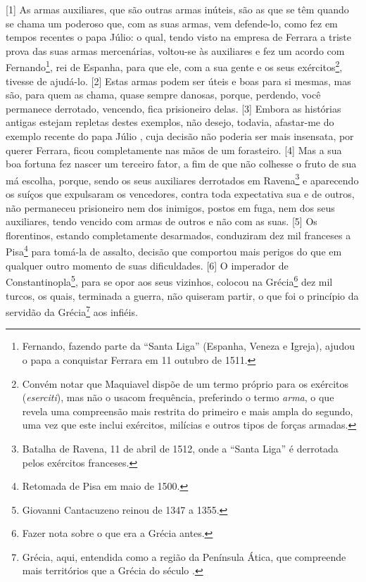 {[}1{]} As armas auxiliares, que são outras armas inúteis, são as que se
têm quando se chama um poderoso que, com as suas armas, vem defende-lo,
como fez em tempos recentes o papa Júlio: o qual, tendo visto na empresa
de Ferrara a triste prova das suas armas mercenárias, voltou-se às
auxiliares e fez um acordo com Fernando\footnote{Fernando, fazendo parte
  da ``Santa Liga'' (Espanha, Veneza e Igreja), ajudou o papa a
  conquistar Ferrara em 11 outubro de 1511.}, rei de Espanha, para que
ele, com a sua gente e os seus exércitos\footnote{Convém notar que
  Maquiavel dispõe de um termo próprio para os exércitos
  (\emph{eserciti}), mas não o usacom frequência, preferindo o termo
  \emph{arma}, o que revela uma compreensão mais restrita do primeiro e
  mais ampla do segundo, uma vez que este inclui exércitos, milícias e
  outros tipos de forças armadas.}, tivesse de ajudá-lo. {[}2{]} Estas
armas podem ser úteis e boas para si mesmas, mas são, para quem as
chama, quase sempre danosas, porque, perdendo, você permanece derrotado,
vencendo, fica prisioneiro delas. {[}3{]} Embora as histórias antigas
estejam repletas destes exemplos, não desejo, todavia, afastar-me do
exemplo recente do papa Júlio , cuja decisão não poderia ser mais
insensata, por querer Ferrara, ficou completamente nas mãos de um
forasteiro. {[}4{]} Mas a sua boa fortuna fez nascer um terceiro fator,
a fim de que não colhesse o fruto de sua má escolha, porque, sendo os
seus auxiliares derrotados em Ravena\footnote{Batalha de Ravena, 11 de
  abril de 1512, onde a ``Santa Liga'' é derrotada pelos exércitos
  franceses.} e aparecendo os suíços que expulsaram os vencedores,
contra toda expectativa sua e de outros, não permaneceu prisioneiro nem
dos inimigos, postos em fuga, nem dos seus auxiliares, tendo vencido com
armas de outros e não com as suas. {[}5{]} Os florentinos, estando
completamente desarmados, conduziram dez mil franceses a Pisa\footnote{Retomada
  de Pisa em maio de 1500.} para tomá-la de assalto, decisão que
comportou mais perigos do que em qualquer outro momento de suas
dificuldades. {[}6{]} O imperador de Constantinopla\footnote{Giovanni 
  Cantacuzeno reinou de 1347 a 1355.}, para se opor aos seus vizinhos,
colocou na Grécia\footnote{Fazer nota sobre o que era a Grécia antes.}
dez mil turcos, os quais, terminada a guerra, não quiseram partir, o que
foi o princípio da servidão da Grécia\footnote{Grécia, aqui, entendida
  como a região da Península Ática, que compreende mais territórios que
  a Grécia do século .} aos infiéis.

